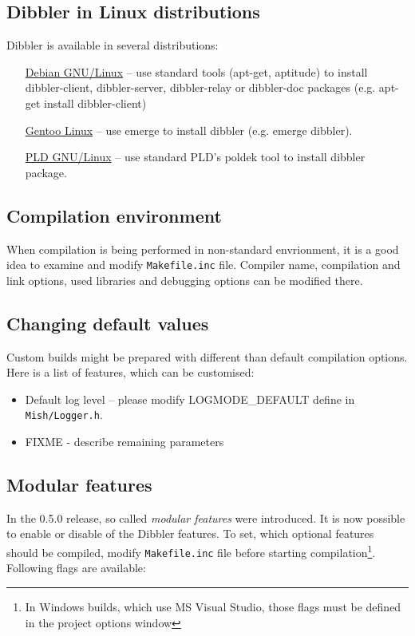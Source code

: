 \subsection{Dibbler in Linux distributions}
Dibbler is available in several distributions:

\begin{itemize}
 \item[\href{http://debian.org}{Debian GNU/Linux}] -- use standard tools
 (apt-get, aptitude) to install dibbler-client, dibbler-server,
 dibbler-relay or dibbler-doc packages (e.g. apt-get install dibbler-client)
 \item[\href{http://www.gentoo.org}{Gentoo Linux}] -- use emerge to
 install dibbler (e.g. emerge dibbler).
 \item[\href{http://www.pld-linux.org}{PLD GNU/Linux}] -- use standard
  PLD's poldek tool to install dibbler package.
\end{itemize}

\subsection{Compilation environment}
When compilation is being performed in non-standard envrionment, it is a
good idea to examine and modify \verb+Makefile.inc+ file. Compiler name,
compilation and link options, used libraries and debugging options can
be modified there.

\subsection{Changing default values}
Custom builds might be prepared with different than default
compilation options. Here is a list of features, which can be
customised:
\begin{itemize}
\item Default log level -- please modify LOGMODE\_DEFAULT define in
  \verb+Mish/Logger.h+.
\item FIXME - describe remaining parameters
\end{itemize}

\subsection{Modular features}
\label{modular-features}
In the 0.5.0 release, so called \emph{modular features} were
introduced. It is now possible to enable or disable of the Dibbler
features. To set, which optional features should be compiled, modify
\verb+Makefile.inc+ file before starting compilation\footnote{In Windows
builds, which use MS Visual Studio, those flags must be defined in the
project options window}. Following flags are available:

